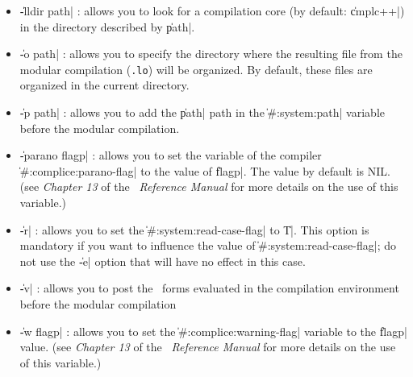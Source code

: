 \begin{itemize}
\item {\Large \|-lldir path|} : allows you to look for a compilation core (by default:  \|cmplc++|) in the directory described by \|path|.

\item {\Large \|-o path|} :  allows you to specify the directory where the resulting file from the modular compilation ({\tt .lo}) will be organized.
By default, these files are organized in the current directory.

\item {\Large \|-p path|} : allows you to add the \|path| path in the \|#:system:path| variable before the modular compilation.

\item {\Large \|-parano flagp|} : allows you to set the variable of the compiler \|#:complice:parano-flag| to the value of \|flagp|.  The value by default is NIL.  (see {\em Chapter 13} of the \LeLisp\ {\em Reference Manual} for more details on the use of this variable.)

\item {\Large \|-r|} : allows you to set the \|#:system:read-case-flag| to \|T|.  This option is mandatory if you want to influence the value of \|#:system:read-case-flag|; do not use the \|-e| option that will have no effect in this case.

\item {\Large \|-v|} : allows you to post the \LeLisp\ forms evaluated in the compilation environment before the modular compilation

\item {\Large \|-w flagp|} : allows you to set the \|#:complice:warning-flag| variable to the \|flagp| value.  (see {\em Chapter 13} of the \LeLisp\ {\em Reference Manual} for more details on the use of this variable.)
\end{itemize}
